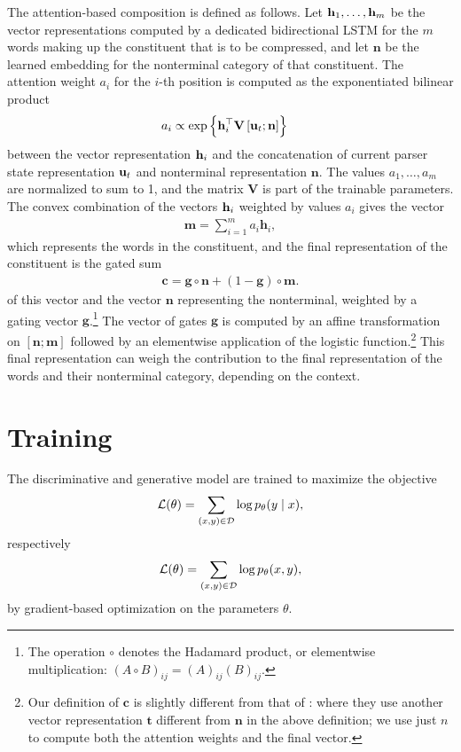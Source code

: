     The attention-based composition is defined as follows. Let $\mathbf{h}_1, \dots, \mathbf{h}_m$ be the vector representations computed by a dedicated bidirectional LSTM for the $m$ words making up the constituent that is to be compressed, and let $\mathbf{n}$ be the learned embedding for the nonterminal category of that constituent. The attention weight $a_i$ for the $i$-th position is computed as the exponentiated bilinear product
    \begin{align*}
      a_i &\propto \exp \Big\{ \mathbf{h}_i^{\top} \mathbf{V} \, [\mathbf{u}_t ; \mathbf{n}] \Big\}
    \end{align*}
    between the vector representation $\mathbf{h}_i$ and the concatenation of current parser state representation $\mathbf{u}_t$ and nonterminal representation $\mathbf{n}$. The values $a_1, \dots, a_m$ are normalized to sum to 1, and the matrix $\mathbf{V}$ is part of the trainable parameters. The convex combination of the vectors $\mathbf{h}_i$ weighted by values $a_i$ gives the vector
    \begin{align*}
      \mathbf{m} = \sum_{i=1}^m a_i \mathbf{h}_i,
    \end{align*}
    which represents the words in the constituent, and the final representation of the constituent is the gated sum
    \begin{align*}
      \mathbf{c} = \mathbf{g} \circ \mathbf{n} + (1 - \mathbf{g}) \circ \mathbf{m}.
    \end{align*}
    of this vector and the vector $\mathbf{n}$ representing the nonterminal, weighted by a gating vector $\mathbf{g}$.\footnote{The operation $\circ$ denotes the Hadamard product, or elementwise multiplication: $(A \circ B)_{ij} = (A)_{ij}(B)_{ij}$.} The vector of gates $\mathbf{g}$ is computed by an affine transformation on $[ \mathbf{n}; \mathbf{m} ]$ followed by an elementwise application of the logistic function.\footnote{Our definition of $\mathbf{c}$ is slightly different from that of \citet{kuncoro2017syntax}: where they use another vector representation $\mathbf{t}$ different from $\mathbf{n}$ in the above definition; we use just $n$ to compute both the attention weights and the final vector.} This final representation can weigh the contribution to the final representation of the words and their nonterminal category, depending on the context.

\section{Training}
  The discriminative and generative model are trained to maximize the objective
  \begin{align*}
    \mathcal{L}(\theta) = \sum_{(x, y) \in \mathcal{D}} \log p_{\theta} (y \mid x),
  \end{align*}
  respectively
  \begin{align*}
    \mathcal{L}(\theta) = \sum_{(x, y) \in \mathcal{D}} \log p_{\theta} (x, y),
  \end{align*}
  by gradient-based optimization on the parameters $\theta$.

